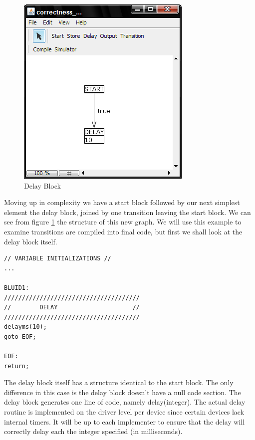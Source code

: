 \begin{figure}[htb]
	\centering
	\includegraphics[width=\imgmedphoto]{./images/correctness_ex_delay.png}
	\caption{Delay Block}
	\label{fig:correctness_ex_delay}
\end{figure}

Moving up in complexity we have a start block followed by our next simplest element the delay block, joined by one transition leaving the start block. We can see from figure \ref{fig:correctness_ex_delay}
the structure of this new graph. We will use this example to examine transitions are compiled into final code, but first we shall look at the delay block itself.

\begin{minipage}{\textwidth}
\begin{lstlisting}[frame=single]
// VARIABLE INITIALIZATIONS //
...

BLUID1:
//////////////////////////////////////
//        DELAY                     //
//////////////////////////////////////
delayms(10);
goto EOF;

EOF:
return;
\end{lstlisting}
\end{minipage}

The delay block itself has a structure identical to the start block. The only difference in this case is the delay block doesn't have a null code section. The delay block generates one line of code, namely delay(integer). The actual delay routine is implemented on the driver level per device since certain devices lack internal timers. It will be up to each implementer to ensure that the delay will correctly delay each the integer specified (in milliseconds). 

